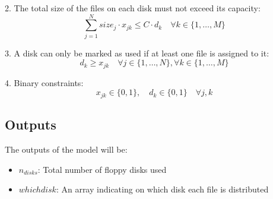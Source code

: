 \documentclass{article}
\begin{document}
2. The total size of the files on each disk must not exceed its capacity:
\[
\sum_{j=1}^{N} size_j \cdot x_{jk} \leq C \cdot d_k \quad \forall k \in \{1, \ldots, M\}
\]

3. A disk can only be marked as used if at least one file is assigned to it:
\[
d_k \geq x_{jk} \quad \forall j \in \{1, \ldots, N\}, \forall k \in \{1, \ldots, M\}
\]

4. Binary constraints:
\[
x_{jk} \in \{0, 1\}, \quad d_k \in \{0, 1\} \quad \forall j, k
\]

\subsection*{Outputs}
The outputs of the model will be:
\begin{itemize}
    \item $n_{disks}$: Total number of floppy disks used
    \item $whichdisk$: An array indicating on which disk each file is distributed
\end{itemize}
\end{document}
